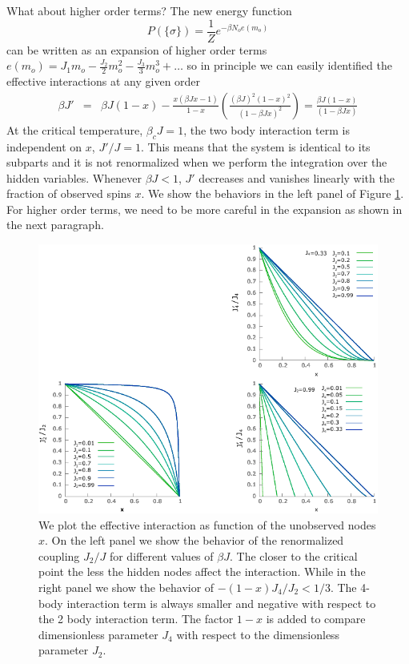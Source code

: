 \documentclass[aps,pre,noshowpacs]{revtex4}
\begin{document}
What about higher order terms? The new energy function
\begin{equation} 
P(\{ \sigma\}) = \frac{1}{Z} e^{-\beta N_o e(m_o)}
\end{equation}
can be written as an expansion of higher order terms $ e(m_o)=  J_1 m_o - \frac{J_2}{2} m_o^2- \frac{J_3}{3} m_o^3  +\ldots$
so in principle we can easily  identified the effective interactions at any given order
\begin{eqnarray}
\beta J'&=& \beta J(1-x) - \frac{x (\beta J x-1)} {1-x} \left(\frac{(\beta J)^2 (1-x)^2}{(1-\beta J x)^2}\right) =\frac{\beta J (1-x) }{ (1-\beta J x)}
\end{eqnarray}
At the critical temperature, $\beta_c J =1$, the two body interaction term is independent on $x$, $J'/J=1$. This means
that the system is identical to its subparts and it is not renormalized when we perform the integration over the hidden variables. 
Whenever $\beta J<1$, $J'$ decreases and vanishes linearly with the fraction of observed spins $x$. We show the behaviors in the left panel of Figure \ref{fig:aboveTc}. For higher order terms, we need to be more careful in the expansion as shown in the next paragraph.
\begin{figure}
\includegraphics[width=.4\columnwidth,angle=0]{J2renorm.pdf}
\caption{We plot the effective interaction as function of the unobserved nodes $x$. On the left panel we show the behavior of 
the renormalized coupling $J_2/J$ for different values of $\beta J$. The closer to the critical point the less the hidden nodes affect
the interaction. While in the right panel we show the behavior of $-(1-x) J_4/J_2<1/3$. The 4-body interaction term is always smaller and negative with respect to the 2 body interaction term. The factor $1-x$ is added to compare dimensionless parameter $J_4$ with respect to the dimensionless parameter $J_2$.}
\label{fig:aboveTc}
\end{figure}
\end{document}
